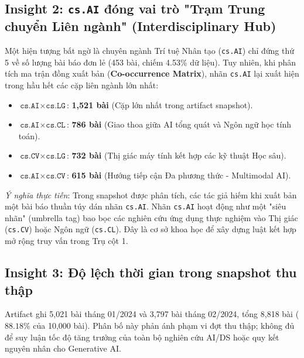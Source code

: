 \subsection{Insight 2: \texttt{cs.AI} đóng vai trò "Trạm Trung chuyển Liên ngành" (Interdisciplinary Hub)}
Một hiện tượng bất ngờ là chuyên ngành Trí tuệ Nhân tạo (\texttt{cs.AI}) chỉ đứng thứ 5 về số lượng bài báo đơn lẻ (453 bài, chiếm 4.53\% dữ liệu). Tuy nhiên, khi phân tích ma trận đồng xuất bản (\textbf{Co-occurrence Matrix}), nhãn \texttt{cs.AI} lại xuất hiện trong hầu hết các cặp liên ngành lớn nhất:
\begin{itemize}
  \item $\texttt{cs.AI} \times \texttt{cs.LG}$: \textbf{1,521 bài} (Cặp lớn nhất trong artifact snapshot).
  \item $\texttt{cs.AI} \times \texttt{cs.CL}$: \textbf{786 bài} (Giao thoa giữa AI tổng quát và Ngôn ngữ học tính toán).
  \item $\texttt{cs.CV} \times \texttt{cs.LG}$: \textbf{732 bài} (Thị giác máy tính kết hợp các kỹ thuật Học sâu).
  \item $\texttt{cs.AI} \times \texttt{cs.CV}$: \textbf{615 bài} (Hướng tiếp cận Đa phương thức - Multimodal AI).
\end{itemize}
\textit{Ý nghĩa thực tiễn}: Trong snapshot được phân tích, các tác giả hiếm khi xuất bản một bài báo thuần túy dán nhãn \texttt{cs.AI}. Nhãn \texttt{cs.AI} hoạt động như một "siêu nhãn" (umbrella tag) bao bọc các nghiên cứu ứng dụng thực nghiệm vào Thị giác (\texttt{cs.CV}) hoặc Ngôn ngữ (\texttt{cs.CL}). Đây là cơ sở khoa học để xây dựng luật kết hợp mở rộng truy vấn trong Trụ cột 1.

\subsection{Insight 3: Độ lệch thời gian trong snapshot thu thập}
Artifact ghi 5,021 bài tháng 01/2024 và 3,797 bài tháng 02/2024, tổng 8,818 bài ($88.18\%$ của 10,000 bài). Phân bố này phản ánh phạm vi đợt thu thập; không đủ để suy luận tốc độ tăng trưởng của toàn bộ nghiên cứu AI/DS hoặc quy kết nguyên nhân cho Generative AI.


